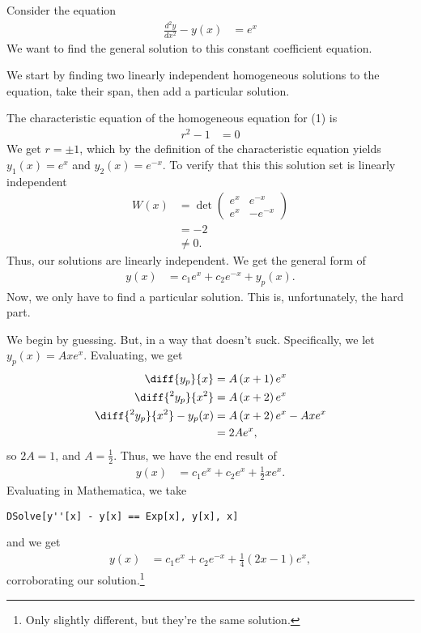 \documentclass[10pt]{mypackage}
\begin{document}
\begin{example}
  Consider the equation
  \begin{align*}
    \frac{d^2y}{dx^2} - y(x) &= e^{x}\tag{1}
  \end{align*}
  We want to find the general solution to this constant coefficient equation.\newline

  We start by finding two linearly independent homogeneous solutions to the equation, take their span, then add a particular solution.\newline

  The characteristic equation of the homogeneous equation for (1) is
  \begin{align*}
    r^2 - 1 &= 0
  \end{align*}
  We get $r=\pm 1$, which by the definition of the characteristic equation yields $y_1(x) = e^{x}$ and $y_2(x) = e^{-x}$. To verify that this this solution set is linearly independent
  {\renewcommand{\arraystretch}{1.25}
    \begin{align*}
      W(x) &= \det \begin{pmatrix}e^{x} & e^{-x} \\ e^{x} & -e^{-x}\end{pmatrix}\\
           &= -2\\
           &\neq 0.
  \end{align*}
  }
  Thus, our solutions are linearly independent. We get the general form of
  \begin{align*}
    y(x) &= c_1e^{x} + c_2e^{-x} + y_p(x).
  \end{align*}
  Now, we only have to find a particular solution. This is, unfortunately, the hard part.\newline

  We begin by guessing. But, in a way that doesn't suck. Specifically, we let $y_p(x) = Axe^{x}$. Evaluating, we get
  \begin{align*}
    \diff{y_p}{x} &= A\left(x+1\right)e^{x}\\
    \diff{^2y_p}{x^2} &= A\left(x+2\right)e^{x}\\
     \diff{^2y_p}{x^2}- y_p(x) &= A\left(x+2\right)e^{x} - Axe^{x}\\
                        &= 2Ae^{x},
  \end{align*}
  so $2A = 1$, and $A = \frac{1}{2}$. Thus, we have the end result of
  \begin{align*}
    y(x) &= c_1e^{x} + c_2e^{x} + \frac{1}{2}xe^{x}.
  \end{align*}
  Evaluating in Mathematica, we take
  \begin{lstlisting}[style=mathematicastyle]
    DSolve[y''[x] - y[x] == Exp[x], y[x], x]
  \end{lstlisting}
  and we get
  \begin{align*}
    y(x) &= c_1e^{x} + c_2e^{-x} + \frac{1}{4}\left(2x-1\right)e^{x},
  \end{align*}
  corroborating our solution.\footnote{Only slightly different, but they're the same solution.}
\end{example}
\end{document}
